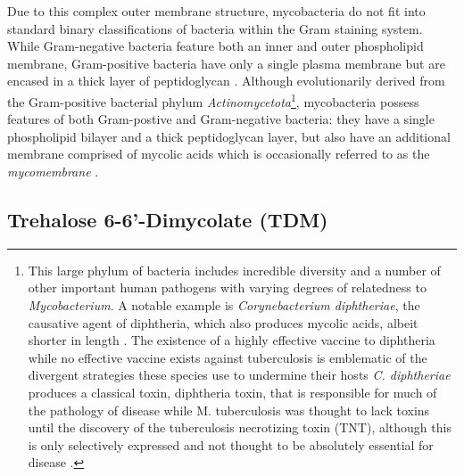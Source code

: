 Due to this complex outer membrane structure, mycobacteria do not fit into standard binary classifications of bacteria within the Gram staining system. While Gram\hyp{}negative bacteria feature both an inner and outer phospholipid membrane, Gram\hyp{}positive bacteria have only a single plasma membrane but are encased in a thick layer of peptidoglycan \citep{Carlone1982, Salton1953}. Although evolutionarily derived from the Gram\hyp{}positive bacterial phylum \textit{Actinomycetota}\footnote{This large phylum of bacteria includes incredible diversity and a number of other important human pathogens with varying degrees of relatedness to \textit{Mycobacterium}. A notable example is \textit{Corynebacterium diphtheriae}, the causative agent of diphtheria, which also produces mycolic acids, albeit shorter in length \citep{vanderPeet2015}. The existence of a highly effective vaccine to diphtheria while no effective vaccine exists against tuberculosis is emblematic of the divergent strategies these species use to undermine their hosts \textit{C. diphtheriae} produces a classical toxin, diphtheria toxin, that is responsible for much of the pathology of disease while M. tuberculosis was thought to lack toxins until the discovery of the tuberculosis necrotizing toxin (TNT), although this is only selectively expressed and not thought to be absolutely essential for disease \citep{Danilchanka2014, Pajuelo2018, Pajuelo2020, Pajuelo2021, Tak2019, Tak2021, IzquierdoLafuente2021, Sun2015}.}, mycobacteria possess features of both Gram\hyp{}postive and Gram\hyp{}negative bacteria: they have a single phospholipid bilayer and a thick peptidoglycan layer, but also have an additional membrane comprised of mycolic acids which is occasionally referred to as the \textit{mycomembrane} \citep{Jankute2015, Brennan2003,  Brennan1995, Chatterjee1997}.

\subsection{Trehalose 6\hyp{}6'\hyp{}Dimycolate (TDM)}\label{tdm}

